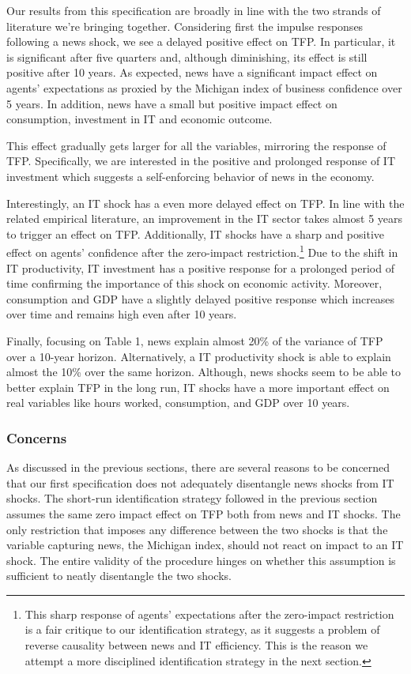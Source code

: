 \documentclass{article}
\begin{document}
Our results from this specification are broadly in line with the two strands of literature we're bringing together. Considering first the impulse responses following a news shock, we see a delayed positive effect on TFP. In particular, it is significant after five quarters and, although diminishing, its effect is still positive after 10 years. As expected, news have a significant impact effect on agents' expectations as proxied by the Michigan index of business confidence over 5 years. In addition, news have a small but positive impact effect on consumption, investment in IT and economic outcome.

This effect gradually gets larger for all the variables, mirroring the response of TFP. Specifically, we are interested in the positive and prolonged response of IT investment which suggests a self-enforcing behavior of news in the economy.

Interestingly, an IT shock has a even more delayed effect on TFP. In line with the related empirical literature, an improvement in the IT sector takes almost 5 years to trigger an effect on TFP. Additionally, IT shocks have a sharp and positive effect on agents' confidence after the zero-impact restriction.\footnote{This sharp response of agents' expectations after the zero-impact restriction is a fair critique to our identification strategy, as it suggests a problem of reverse causality between news and IT efficiency. This is the reason we attempt a more disciplined identification strategy in the next section.} Due to the shift in IT productivity, IT investment has a positive response for a prolonged period of time confirming the importance of this shock on economic activity. Moreover, consumption and GDP have a slightly delayed positive response which increases over time and remains high even after 10 years.

Finally, focusing on Table 1, news explain almost 20\% of the variance of TFP over a 10-year horizon. Alternatively, a IT productivity shock is able to explain almost the 10\% over the same horizon. Although, news shocks seem to be able to better explain TFP in the long run, IT shocks have a more important effect on real variables like hours worked, consumption, and GDP over 10 years.


\subsubsection{Concerns}


As discussed in the previous sections, there are several reasons to be concerned that our first specification does not adequately disentangle news shocks from IT shocks. The short-run identification strategy followed in the previous section assumes the same zero impact effect on TFP both from news and IT shocks. The only restriction that imposes any difference between the two shocks is that the variable capturing news, the Michigan index, should not react on impact to an IT shock. The entire validity of the procedure hinges on whether this assumption is sufficient to neatly disentangle the two shocks.
\end{document}
